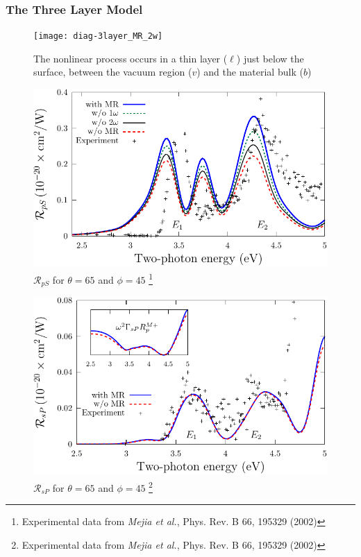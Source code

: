 \documentclass{beamer}
\begin{document}
\begin{frame}
\frametitle{The Three Layer Model}
\begin{figure}
\centering
\texttt{[image: diag-3layer\_MR\_2w]}
\caption{The nonlinear process occurs in a thin layer ($\ell$) just below the
surface, between the vacuum region ($v$) and the material bulk ($b$)}
\end{figure}
\end{frame}

\begin{frame}
\begin{figure}
\centering
\includegraphics[width=\textwidth]{fig-Si1x1-Mejia_RpS}
\caption{$\mathcal{R}_{pS}$ for $\theta=65$ and $\phi=45$%
\footnote{Experimental data from \emph{Mejia et al.}, Phys. Rev. B 66, 195329 (2002)}}
\end{figure}
\end{frame}

\begin{frame}
\begin{figure}
\centering
\includegraphics[width=\textwidth]{fig-Si1x1-Mejia_RsP}
\caption{$\mathcal{R}_{sP}$ for $\theta=65$ and $\phi=45$%
\footnote{Experimental data from \emph{Mejia et al.}, Phys. Rev. B 66, 195329 (2002)}}
\end{figure}
\end{frame}
\end{document}
